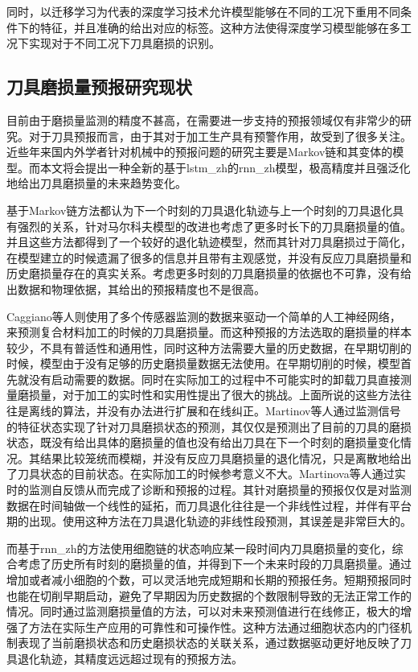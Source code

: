 同时，以迁移学习\cite{pan2010survey}为代表的深度学习技术允许模型能够在不同的工况下重用不同条件下的特征，并且准确的给出对应的标签。这种方法使得深度学习模型能够在多工况下实现对于不同工况下刀具磨损的识别。

\subsection{刀具磨损量预报研究现状}

目前由于磨损量监测的精度不甚高，在需要进一步支持的预报领域仅有非常少的研究。对于刀具预报而言，由于其对于加工生产具有预警作用，故受到了很多关注。近些年来国内外学者针对机械中的预报问题的研究主要是Markov链和其变体的模型\cite{wang2002hidden,karandikar2014tool,ertunc2001decision}。而本文将会提出一种全新的基于\gls{lstm_zh}的\gls{rnn_zh}模型，极高精度并且强泛化地给出刀具磨损量的未来趋势变化。

基于Markov链方法都认为下一个时刻的刀具退化轨迹与上一个时刻的刀具退化具有强烈的关系，针对马尔科夫模型的改进也考虑了更多时长下的刀具磨损量的值。并且这些方法都得到了一个较好的退化轨迹模型，然而其针对刀具磨损过于简化，在模型建立的时候遗漏了很多的信息并且带有主观感觉，并没有反应刀具磨损量和历史磨损量存在的真实关系。考虑更多时刻的刀具磨损量的依据也不可靠，没有给出数据和物理依据，其给出的预报精度也不是很高。

Caggiano等人\cite{caggiano2018multiple}则使用了多个传感器监测的数据来驱动一个简单的人工神经网络，来预测复合材料加工的时候的刀具磨损量。而这种预报的方法选取的磨损量的样本较少，不具有普适性和通用性，同时这种方法需要大量的历史数据，在早期切削的时候，模型由于没有足够的历史磨损量数据无法使用。在早期切削的时候，模型首先就没有启动需要的数据。同时在实际加工的过程中不可能实时的卸载刀具直接测量磨损量，对于加工的实时性和实用性提出了很大的挑战。上面所说的这些方法往往是离线的算法，并没有办法进行扩展和在线纠正。Martinov等人\cite{martinov2015real}通过监测信号的特征状态实现了针对刀具磨损状态的预测，其仅仅是预测出了目前的刀具的磨损状态，既没有给出具体的磨损量的值也没有给出刀具在下一个时刻的磨损量变化情况。其结果比较笼统而模糊，并没有反应刀具磨损量的退化情况，只是离散地给出了刀具状态的目前状态。在实际加工的时候参考意义不大。Martinova等人\cite{martinova2012diagnostics}通过实时的监测自反馈从而完成了诊断和预报的过程。其针对磨损量的预报仅仅是对监测数据在时间轴做一个线性的延拓，而刀具退化往往是一个非线性过程，并伴有平台期的出现。使用这种方法在刀具退化轨迹的非线性段预测，其误差是非常巨大的。

而基于\gls{rnn_zh}的方法使用细胞链的状态响应某一段时间内刀具磨损量的变化，综合考虑了历史所有时刻的磨损量的值，并得到下一个未来时段的刀具磨损量。通过增加或者减小细胞的个数，可以灵活地完成短期和长期的预报任务。短期预报同时也能在切削早期启动，避免了早期因为历史数据的个数限制导致的无法正常工作的情况。同时通过监测磨损量值的方法，可以对未来预测值进行在线修正，极大的增强了方法在实际生产应用的可靠性和可操作性。这种方法通过细胞状态内的门径机制表现了当前磨损状态和历史磨损状态的关联关系，通过数据驱动更好地反映了刀具退化轨迹，其精度远远超过现有的预报方法。

